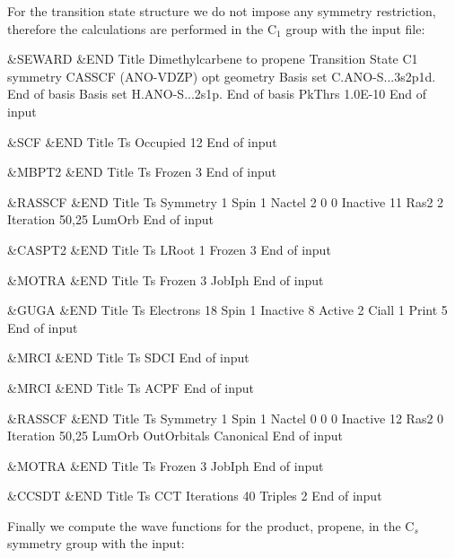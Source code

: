 For the transition state structure we do not impose any symmetry
restriction, therefore the calculations are performed in the C$_1$ group
with the input file:

\begin{inputlisting}
 &SEWARD &END
Title
 Dimethylcarbene to propene
 Transition State C1 symmetry  
 CASSCF (ANO-VDZP) opt geometry
Basis set
C.ANO-S...3s2p1d.
End of basis
Basis set
H.ANO-S...2s1p.
End of basis
PkThrs
 1.0E-10
End of input

 &SCF &END
Title
 Ts
Occupied
 12 
End of input

 &MBPT2 &END
Title 
 Ts 
Frozen
 3
End of input

 &RASSCF &END
Title
 Ts
Symmetry 
 1
Spin
 1
Nactel
 2  0  0
Inactive
 11   
Ras2  
 2
Iteration
50,25
LumOrb
End of input

 &CASPT2 &END
Title
 Ts
LRoot
 1
Frozen
 3
End of input

 &MOTRA &END
Title
 Ts
Frozen
 3
JobIph
End of input

 &GUGA &END
Title
 Ts
Electrons
 18
Spin
 1
Inactive
 8
Active
 2
Ciall
 1
Print
 5
End of input

 &MRCI &END
Title
 Ts            
SDCI
End of input

 &MRCI &END
Title
 Ts            
ACPF
End of input

 &RASSCF &END
Title
 Ts
Symmetry
 1
Spin
 1
Nactel
 0  0  0
Inactive
 12  
Ras2
 0  
Iteration
50,25
LumOrb
OutOrbitals
 Canonical
End of input

 &MOTRA &END
Title
 Ts
Frozen
 3
JobIph
End of input

 &CCSDT &END
Title
 Ts  
CCT
Iterations
 40
Triples
 2
End of input
\end{inputlisting}

Finally we compute the wave functions for the product, propene, in the
C$_s$ symmetry group with the input:

